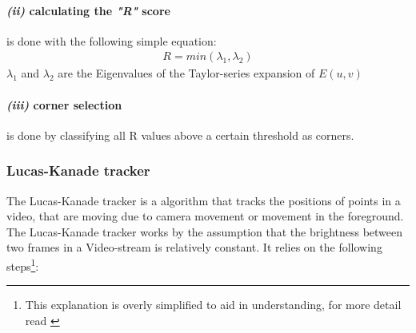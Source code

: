 \documentclass[11pt,a4paper]{article}
\begin{document}
\paragraph{\emph{(ii)} calculating the \textit{"R"} score} is done with the following simple equation:
\begin{align*}
   R = min(\lambda_1, \lambda_2) 
\end{align*}
$\lambda_1$ and $\lambda_2$ are the Eigenvalues of the Taylor-series expansion of $E(u,v)$
\paragraph{\emph{(iii)} corner selection} is done by classifying all R values above a certain threshold as corners.

\subsubsection{Lucas-Kanade tracker} \label{Sec:Lucas-Kanade}
The Lucas-Kanade tracker is a algorithm that tracks the positions of points in a video, that are moving due to camera movement or movement in the foreground.
The Lucas-Kanade tracker works by the assumption that the brightness between two frames in a Video-stream is relatively constant. 
It relies on the following steps\footnote{This explanation is overly simplified to aid in understanding, for more detail read \cite{lucas1981iterative}}:
\end{document}
